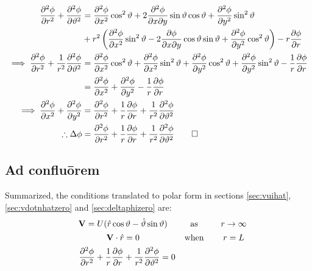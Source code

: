 \documentclass[a4paper,12pt]{article}
\newcommand{\rhat}{\hat{r}}
\newcommand{\thetahat}{\hat{\theta}}
\renewcommand{\theta}{\vartheta}      		%
\newcommand{\partialder}[2]{\frac{\partial #1}{\partial #2}}        %
\newcommand{\vecpadding}{\vspace*{0.15cm}}					%
\begin{document}
\begin{align}
	\notag\frac{\partial^2\phi}{\partial r^2}+\frac{\partial^2\phi}{\partial\theta^2}&=\frac{\partial^2\phi}{\partial x^2}\cos^2\theta+2\frac{\partial^2\phi}{\partial x\partial y}\sin\theta\cos\theta+\frac{\partial^2\phi}{\partial y^2}\sin^2\theta\\
	\notag&+r^2\left(\frac{\partial^2\phi}{\partial x^2}\sin^2\theta-2\frac{\partial\phi}{\partial x\partial y}\cos\theta\sin\theta+\frac{\partial^2\phi}{\partial y^2}\cos^2\theta\right)-r\partialder{\phi}{r}\\
	\notag\implies\frac{\partial^2\phi}{\partial r^2}+\frac{1}{r^2}\frac{\partial^2\phi}{\partial\theta^2}&=\frac{\partial^2\phi}{\partial x^2}\cos^2\theta+\frac{\partial^2\phi}{\partial x^2}\sin^2\theta+\frac{\partial^2\phi}{\partial y^2}\cos^2\theta+\frac{\partial^2\phi}{\partial y^2}\sin^2\theta-\frac{1}{r}\partialder{\phi}{r}\\
	\notag&=\frac{\partial^2\phi}{\partial x^2}+\frac{\partial^2\phi}{\partial y^2}-\frac{1}{r}\partialder{\phi}{r}\\
	\notag\implies\frac{\partial^2\phi}{\partial x^2}+\frac{\partial^2\phi}{\partial y^2}&=\frac{\partial^2\phi}{\partial r^2}+\frac{1}{r}\partialder{\phi}{r}+\frac{1}{r^2}\frac{\partial^2\phi}{\partial\theta^2}\\
	\label{polap:final}\therefore\Delta\phi&=\frac{\partial^2\phi}{\partial r^2}+\frac{1}{r}\partialder{\phi}{r}+\frac{1}{r^2}\frac{\partial^2\phi}{\partial\theta^2}\qed
\end{align}

\subsection{Ad confluōrem}
Summarized, the conditions translated to polar form in sections \ref{sec:vuihat}, \ref{sec:vdotnhatzero} and \ref{sec:deltaphizero} are:
$$\begin{matrix}
	&\mathbf{V}=U(\rhat\cos\theta-\thetahat\sin\theta)\quad&\text{as}\quad&r\rightarrow\infty\vecpadding\\
	&\mathbf{V}\cdot\rhat=0\quad&\text{when}\quad&r=L\vecpadding\\
	&\dfrac{\partial^2\phi}{\partial r^2}+\dfrac{1}{r}\dfrac{\partial\phi}{\partial r}+\dfrac{1}{r^2}\dfrac{\partial^2\phi}{\partial\theta^2}=0
\end{matrix}$$
\end{document}
